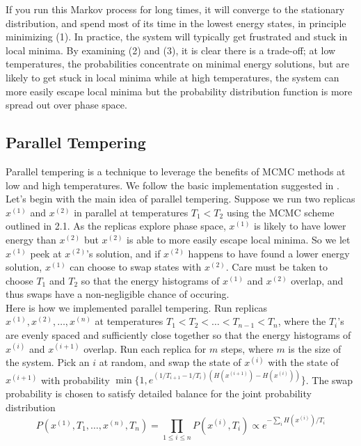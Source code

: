 \documentclass[12pt]{article}
\newcommand{\1}{\mathbf{1}}
\theoremstyle{remark}
\theoremstyle{definition}
\theoremstyle{proposition}
\theoremstyle{lemma}
\theoremstyle{definition}
\begin{document}
	If you run this Markov process for long times, it will converge to the stationary distribution, and spend most of its time in the lowest energy states, in principle minimizing (1). In practice, the system will typically get frustrated and stuck in local minima. By examining (2) and (3), it is clear there is a trade-off; at low temperatures, the probabilities concentrate on minimal energy solutions, but are likely to get stuck in local minima while at high temperatures, the system can more easily escape local minima but the probability distribution function is more spread out over phase space.
	
	\subsection{Parallel Tempering}
	\indent \indent Parallel tempering is a technique to leverage the benefits of MCMC methods at low and high temperatures. We follow the basic implementation suggested in \cite{B509983H}. \\
	\indent Let's begin with the main idea of parallel tempering. Suppose we run two replicas $x^{(1)}$ and $x^{(2)}$ in parallel at temperatures $T_1 < T_2$ using the MCMC scheme outlined in 2.1. As the replicas explore phase space, $x^{(1)}$ is likely to have lower energy than $x^{(2)}$ but $x^{(2)}$ is able to more easily escape local minima. So we let $x^{(1)}$ peek at $x^{(2)}$'s solution, and if $x^{(2)}$ happens to have found a lower energy solution, $x^{(1)}$ can choose to swap states with $x^{(2)}$. Care must be taken to choose $T_1$ and $T_2$ so that the energy histograms of $x^{(1)}$ and $x^{(2)}$ overlap, and thus swaps have a non-negligible chance of occuring. \\
	\indent Here is how we implemented parallel tempering. Run replicas $x^{(1)}, x^{(2)}, \ldots, x^{(n)}$ at temperatures $T_1 < T_2 < \ldots < T_{n-1} < T_n$, where the $T_i$'s are evenly spaced and sufficiently close together so that the energy histograms of $x^{(i)}$ and $x^{(i+1)}$ overlap. Run each replica for $m$ steps, where $m$ is the size of the system. Pick an $i$ at random, and swap the state of  $x^{(i)}$ with the state of $x^{(i+1)}$ with probability $\min\{1, e^{(1/T_{i+1}-1/{T_i})(H(x^{(i+1)}) - H(x^{(i)}))}\}$. The swap probability is chosen to satisfy detailed balance for the joint probability distribution 
	$$P(x^{(1)}, T_1, \ldots, x^{(n)}, T_n) = \prod_{1\leq i \leq n} P(x^{(i)}, T_i) \propto e^{-\sum_i H(x^{(i)})/T_i}$$
\end{document}
